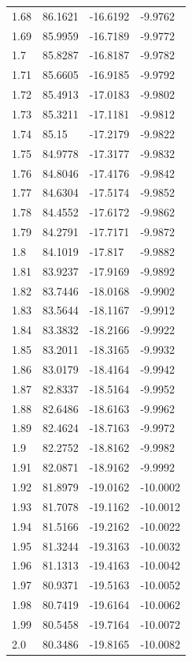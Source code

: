 \begin{tabular}{llll}
1.68 & 86.1621 & -16.6192 & -9.9762 \\
1.69 & 85.9959 & -16.7189 & -9.9772 \\
1.7 & 85.8287 & -16.8187 & -9.9782 \\
1.71 & 85.6605 & -16.9185 & -9.9792 \\
1.72 & 85.4913 & -17.0183 & -9.9802 \\
1.73 & 85.3211 & -17.1181 & -9.9812 \\
1.74 & 85.15 & -17.2179 & -9.9822 \\
1.75 & 84.9778 & -17.3177 & -9.9832 \\
1.76 & 84.8046 & -17.4176 & -9.9842 \\
1.77 & 84.6304 & -17.5174 & -9.9852 \\
1.78 & 84.4552 & -17.6172 & -9.9862 \\
1.79 & 84.2791 & -17.7171 & -9.9872 \\
1.8 & 84.1019 & -17.817 & -9.9882 \\
1.81 & 83.9237 & -17.9169 & -9.9892 \\
1.82 & 83.7446 & -18.0168 & -9.9902 \\
1.83 & 83.5644 & -18.1167 & -9.9912 \\
1.84 & 83.3832 & -18.2166 & -9.9922 \\
1.85 & 83.2011 & -18.3165 & -9.9932 \\
1.86 & 83.0179 & -18.4164 & -9.9942 \\
1.87 & 82.8337 & -18.5164 & -9.9952 \\
1.88 & 82.6486 & -18.6163 & -9.9962 \\
1.89 & 82.4624 & -18.7163 & -9.9972 \\
1.9 & 82.2752 & -18.8162 & -9.9982 \\
1.91 & 82.0871 & -18.9162 & -9.9992 \\
1.92 & 81.8979 & -19.0162 & -10.0002 \\
1.93 & 81.7078 & -19.1162 & -10.0012 \\
1.94 & 81.5166 & -19.2162 & -10.0022 \\
1.95 & 81.3244 & -19.3163 & -10.0032 \\
1.96 & 81.1313 & -19.4163 & -10.0042 \\
1.97 & 80.9371 & -19.5163 & -10.0052 \\
1.98 & 80.7419 & -19.6164 & -10.0062 \\
1.99 & 80.5458 & -19.7164 & -10.0072 \\
2.0 & 80.3486 & -19.8165 & -10.0082 \\

\end{tabular}

